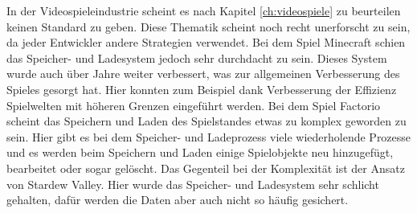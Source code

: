 In der Videospieleindustrie scheint es nach Kapitel \ref{ch:videospiele} zu beurteilen keinen Standard zu geben. Diese Thematik scheint noch recht unerforscht zu sein, da jeder Entwickler andere Strategien verwendet. Bei dem Spiel Minecraft schien das Speicher- und Ladesystem jedoch sehr durchdacht zu sein. Dieses System wurde auch über Jahre weiter verbessert, was zur allgemeinen Verbesserung des Spieles gesorgt hat. Hier konnten zum Beispiel dank Verbesserung der Effizienz Spielwelten mit höheren Grenzen eingeführt werden. Bei dem Spiel Factorio scheint das Speichern und Laden des Spielstandes etwas zu komplex geworden zu sein. Hier gibt es bei dem Speicher- und Ladeprozess viele wiederholende Prozesse und es werden beim Speichern und Laden einige Spielobjekte neu hinzugefügt, bearbeitet oder sogar gelöscht. Das Gegenteil bei der Komplexität ist der Ansatz von Stardew Valley. Hier wurde das Speicher- und Ladesystem sehr schlicht gehalten, dafür werden die Daten aber auch nicht so häufig gesichert. 

